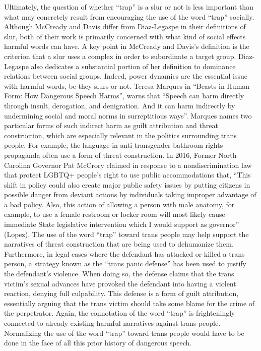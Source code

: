 \documentclass[12pt, letterpaper]{article}
\begin{document}
\begin{mla}
Ultimately, the question of whether ``trap'' is a slur or not is less
important than what may concretely result from encouraging the use of the word
``trap'' socially. Although McCready and Davis differ from Diaz-Legaspe in
their definitions of slur, both of their work is primarily concerned with what
kind of social effects harmful words can have. A key point in McCready and
Davis's definition is the criterion that a slur uses a complex in order to
subordinate a target group. Diaz-Legaspe also dedicates a substantial portion
of her definition to dominance relations between social groups. Indeed, power
dynamics are the essential issue with harmful words, be they slurs or not.
Teresa Marques in ``Beasts in Human Form: How Dangerous Speech Harms'', warns
that ``Speech can harm directly through insult, derogation, and denigration.
And it can harm indirectly by undermining social and moral norms in
surreptitious ways''. Marques names two particular forms of such indirect harm
as guilt attribution and threat construction, which are especially relevant
in the politics surrounding trans people. For example, the language in
anti-transgender bathroom rights propaganda often use a form of threat
construction. In 2016, Former North Carolina Governor Pat McCrory claimed in
response to a nondiscrimination law that protect LGBTQ+ people's right to use
public accommodations that, ``This shift in policy could also create major
public safety issues by putting citizens in possible danger from deviant
actions by individuals taking improper advantage of a bad policy. Also, this
action of allowing a person with male anatomy, for example, to use a female
restroom or locker room will most likely cause immediate State legislative
intervention which I would support as governor'' (Lopez). The use of the word
``trap'' toward trans people may help support the narratives of threat
construction that are being used to dehumanize them. Furthermore, in legal
cases where the defendant has attacked or killed a trans person, a strategy
known as the ``trans panic defense'' has been used to justify the defendant's
violence. When doing so, the defense claims that the trans victim's sexual
advances have provoked the defendant into having a violent reaction, denying
full culpability. This defense is a form of guilt attribution, essentially
arguing that the trans victim should take some blame for the crime of the
perpetrator. Again, the connotation of the word ``trap'' is frighteningly
connected to already existing harmful narratives against trans people.
Normalizing the use of the word ``trap'' toward trans people would have to be
done in the face of all this prior history of dangerous speech.


\end{mla}
\end{document}
